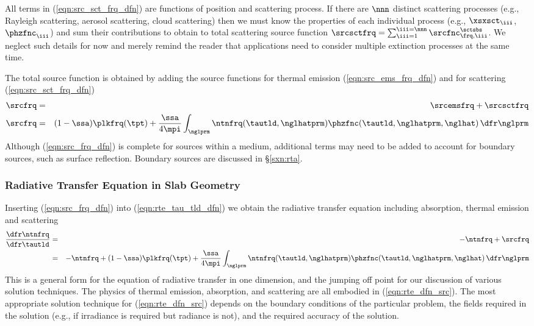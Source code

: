 \documentclass[12pt]{article}
\begin{document}
All terms in (\ref{eqn:src_sct_frq_dfn}) are functions of position and
scattering process.
If there are $\nnn$ distinct scattering processes (e.g., Rayleigh
scattering, aerosol scattering, cloud scattering) then we must know 
the properties of each individual process (e.g., $\xsxsct_{\iii}$,
$\phzfnc_{\iii}$) and sum their contributions to obtain to total
scattering source function $\srcsctfrq = \sum_{\iii=1}^{\iii=\nnn}
\srcfnc_{\frq,\iii}^{\sctsbs}$.
We neglect such details for now and merely remind the reader that
applications need to consider multiple extinction processes
at the same time.

The total source function is obtained by adding the source functions
for thermal emission (\ref{eqn:src_ems_frq_dfn}) and for scattering
(\ref{eqn:src_sct_frq_dfn}) 
\begin{eqnarray}
\srcfrq & = & \srcemsfrq + \srcsctfrq \nonumber \\
\srcfrq & = & (1-\ssa)\plkfrq(\tpt) +
\frac{\ssa}{4\mpi} 
\int_{\nglprm} \ntnfrq(\tautld,\nglhatprm)
\phzfnc(\tautld,\nglhatprm,\nglhat) \,\dfr\nglprm
\label{eqn:src_frq_dfn}
\end{eqnarray}
Although (\ref{eqn:src_frq_dfn}) is complete for sources within a 
medium, additional terms may need to be added to account for
boundary sources, such as 
surface reflection.
Boundary sources are discussed in \S\ref{sxn:rta}.

\subsubsection[Radiative Transfer Equation in Slab Geometry]{Radiative
Transfer Equation in Slab Geometry}\label{sxn:rte_slb}
Inserting (\ref{eqn:src_frq_dfn}) into (\ref{eqn:rte_tau_tld_dfn}) we
obtain the radiative transfer equation including absorption, thermal
emission and scattering
\begin{eqnarray}
\frac{\dfr\ntnfrq}{\dfr\tautld} & = & -\ntnfrq + \srcfrq \nonumber \\
& = & -\ntnfrq + (1-\ssa)\plkfrq(\tpt) +
\frac{\ssa}{4\mpi} \int_{\nglprm} \ntnfrq(\tautld,\nglhatprm) 
\phzfnc(\tautld,\nglhatprm,\nglhat) \,\dfr\nglprm
\label{eqn:rte_dfn_src}
\end{eqnarray}
This is a general form for the equation of radiative transfer in
one dimension, and the jumping off point for our discussion of 
various solution techniques.
The physics of thermal emission, absorption, and scattering are all
embodied in (\ref{eqn:rte_dfn_src}).
The most appropriate solution technique for (\ref{eqn:rte_dfn_src})
depends on the boundary conditions of the particular problem, the
fields required in the solution (e.g., if irradiance is required but
radiance is not), and the required accuracy of the solution.
\end{document}
